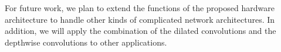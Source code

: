 \documentclass[runningheads]{llncs}
\begin{document}
For future work, we plan to extend the functions of the proposed hardware architecture to handle other kinds of complicated network architectures. In addition, we will apply the combination of the dilated convolutions and the depthwise convolutions to other applications.



\clearpage


\end{document}
